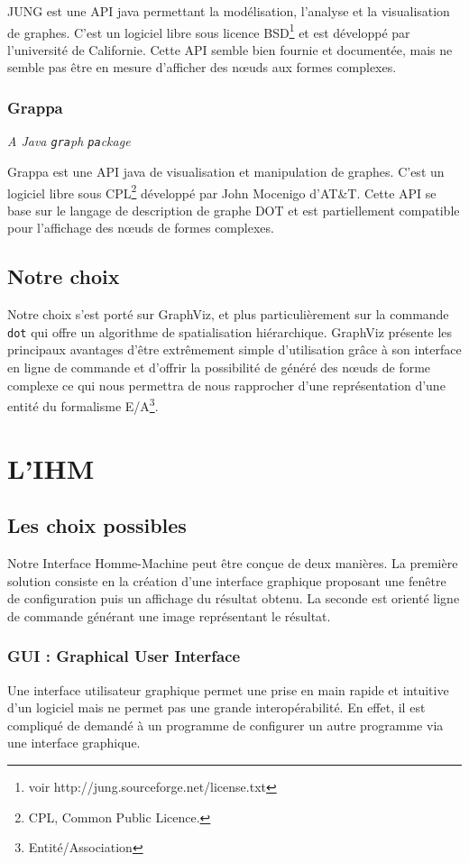 				JUNG est une API java permettant la modélisation, l'analyse et la visualisation de graphes. C'est un logiciel libre sous licence BSD\footnote{voir http://jung.sourceforge.net/license.txt} et est développé par l'université de Californie. Cette API semble bien fournie et documentée, mais ne semble pas être en mesure d'afficher des nœuds aux formes complexes. 
		\subsubsection{Grappa} \textit{A Java \texttt{gra}ph \texttt{pa}ckage}
		
			Grappa est une API java de visualisation et manipulation de graphes. C'est un logiciel libre sous CPL\footnote{CPL, Common Public Licence.} développé par John Mocenigo d'AT\&T. Cette API se base sur le langage de description de graphe DOT et est partiellement compatible pour l'affichage des nœuds de formes complexes.
		
				
  \subsection{Notre choix}
		Notre choix s'est porté sur GraphViz, et plus particulièrement sur la commande \texttt{dot} qui offre un algorithme de spatialisation hiérarchique. GraphViz présente les principaux avantages d'être extrêmement simple d'utilisation grâce à son interface en ligne de commande et d'offrir la possibilité de généré des nœuds de forme complexe ce qui nous permettra de nous rapprocher d'une représentation d'une entité du formalisme E/A\footnote{Entité/Association}.

\section{L'IHM}	
	\subsection{Les choix possibles}
	\label{ihm_choix_possibles}
		Notre Interface Homme-Machine peut être conçue de deux manières. La première solution consiste en la création d'une interface graphique proposant une fenêtre de configuration puis un affichage du résultat obtenu. La seconde est orienté ligne de commande générant une image représentant le résultat. 	
	
		\subsubsection{GUI : \og Graphical User Interface \fg{}}
			Une interface utilisateur graphique permet une prise en main rapide et intuitive d'un logiciel mais ne permet pas une grande interopérabilité. En effet, il est compliqué de demandé à un programme de configurer un autre programme via une interface graphique.
			

